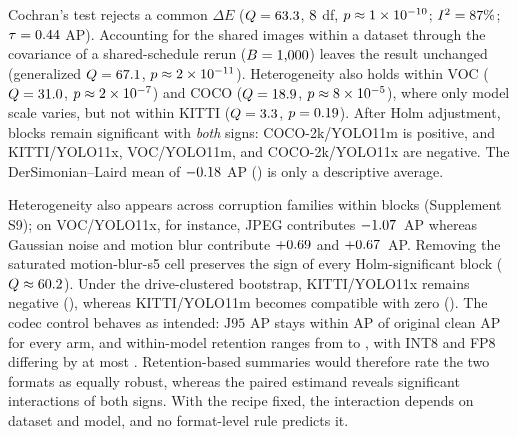\documentclass[a4paper,fleqn]{cas-dc}
\newcommand{\sigstar}{\textsuperscript{*}}
\newcommand{\Jclean}{\mathrm{J95}}
\begin{document}
Cochran's test rejects a common $\Delta E$ ($Q=63.3$, $8$ df, $p\approx1\times10^{-10}$; $I^2=87\%$; $\tau=0.44$ AP). Accounting for the shared images within a dataset through the covariance of a shared-schedule rerun ($B=1{,}000$) leaves the result unchanged (generalized $Q=67.1$, $p\approx2\times10^{-11}$). Heterogeneity also holds within VOC ($Q=31.0$, $p\approx2\times10^{-7}$) and COCO ($Q=18.9$, $p\approx8\times10^{-5}$), where only model scale varies, but not within KITTI ($Q=3.3$, $p=0.19$). After Holm adjustment, \nnHolmSurvivors{} blocks remain significant with \emph{both} signs: COCO-2k/YOLO11m is positive, and KITTI/YOLO11x, VOC/YOLO11m, and COCO-2k/YOLO11x are negative. The DerSimonian--Laird mean of $-0.18$ AP (\nnReMeanCi) is only a descriptive average.

Heterogeneity also appears across corruption families within blocks (Supplement S9); on VOC/YOLO11x, for instance, JPEG contributes $-1.07$~AP whereas Gaussian noise and motion blur contribute $+0.69$ and $+0.67$~AP. Removing the saturated motion-blur-s5 cell preserves the sign of every Holm-significant block ($Q\approx60.2$). Under the drive-clustered bootstrap, KITTI/YOLO11x remains negative (\nnClYoloXKitti), whereas KITTI/YOLO11m becomes compatible with zero (\nnClYoloMKitti). The codec control behaves as intended: $\Jclean$ AP stays within \nnJCleanFid{} AP of original clean AP for every arm, and within-model retention ranges from \nnRetMin{} to \nnRetMax{}, with INT8 and FP8 differing by at most \nnRetDiff. Retention-based summaries would therefore rate the two formats as equally robust, whereas the paired estimand reveals significant interactions of both signs. With the recipe fixed, the interaction depends on dataset and model, and no format-level rule predicts it.

\begin{table}[t]
\centering
\caption{Stage-1 paired contrasts, FP8 minus INT8, per YOLO11 dataset$\times$model block. FP8/INT8 corr.\ AP: absolute 12-cell corrupt-mean AP (floor guard). $G_0$: clean-control ($\Jclean$) gap. $G_{\mathrm{corr}}$: corrupt-mean gap, computed before the absolute columns are rounded. $\Delta E=G_{\mathrm{corr}}-G_0$ with paired-bootstrap interval; \sigstar{} interval excludes zero. $p_{\mathrm{Holm}}$: two-sided bootstrap $p$-value, Holm-adjusted across the nine blocks, with the plus-one rule at $B{=}2000$; the smallest possible raw and adjusted values are $2/2001\approx0.001$ and $9{\times}2/2001\approx0.009$. Bold: blocks significant after Holm adjustment.}
\label{tab:yolo-deltae}
\footnotesize
{\scriptsize\setlength{\tabcolsep}{2.5pt}}
\end{table}
\end{document}
